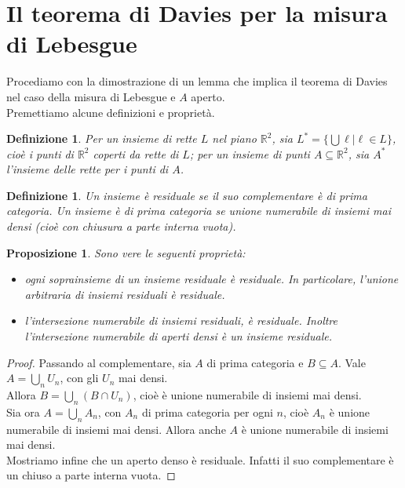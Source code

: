 \documentclass[a4paper, twoside]{article}
\newcommand{\R}{\mathbb{R}}
\newcommand{\<}{\langle}
\renewcommand{\>}{\rangle}
\newtheorem{defin}[teo]{Definizione}
\newtheorem{prop}[teo]{Proposizione}
\begin{document}
	
\newpage

\section{Il teorema di Davies per la misura di Lebesgue}

Procediamo con la dimostrazione di un lemma che implica il teorema di Davies nel caso della misura di Lebesgue e $A$ aperto.\\
Premettiamo alcune definizioni e proprietà.

\begin{defin}
Per un insieme di rette $L$ nel piano $\R^2$, sia $L^{*}= \{\bigcup \ell | \ell \in L\}$, cioè i punti di $\R^2$ coperti da rette di $L$; per un insieme di punti $A \subseteq \R^2$, sia $A^{*}$ l'insieme delle rette per i punti di $A$.
\end{defin}

\begin{defin}
	Un insieme è residuale se il suo complementare è di prima categoria. Un insieme è di prima categoria se unione numerabile di insiemi mai densi (cioè con chiusura a parte interna vuota).
\end{defin}

\begin{prop} \label{prop}
	Sono vere le seguenti proprietà:
	\begin{itemize}
		\item ogni soprainsieme di un insieme residuale è residuale. In particolare, l'unione arbitraria di insiemi residuali è residuale.
		\item l'intersezione numerabile di insiemi residuali, è residuale. Inoltre l'intersezione numerabile di aperti densi è un insieme residuale.
	\end{itemize}
\end{prop}
\begin{proof}
	Passando al complementare, sia $A$ di prima categoria e $B \subseteq A$. Vale $A= \bigcup_n U_n$, con gli $U_n$ mai densi.\\
	Allora $B= \bigcup_n(B \cap U_n)$, cioè è unione numerabile di insiemi mai densi.\\
	Sia ora $A=\bigcup_nA_n$, con $A_n$ di prima categoria per ogni $n$, cioè $A_n$ è unione numerabile di insiemi mai densi. Allora anche $A$ è unione numerabile di insiemi mai densi.\\
	Mostriamo infine che un aperto denso è residuale. Infatti il suo complementare è un chiuso a parte interna vuota.	
\end{proof}
\end{document}
